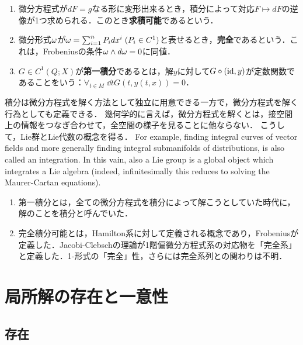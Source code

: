 \documentclass[uplatex, dvipdfmx]{jsreport}
\begin{document}
\begin{definition}\mbox{}
    \begin{enumerate}
        \item 微分方程式が$dF=g$なる形に変形出来るとき，積分によって対応$F\mapsto dF$の逆像が1つ求められる．このとき\textbf{求積可能}であるという．
        \item 微分形式$\omega$が$\omega=\sum_{i=1}^nP_idx^i\;(P_i\in C^1)$と表せるとき，\textbf{完全}であるという．これは，Frobeniusの条件$\omega\wedge d\omega=0$に同値．
        \item $G\in C^1(Q;X)$が\textbf{第一積分}であるとは，解$y$に対して$G\circ(\mathrm{id},y)$が定数関数であることをいう：$\forall_{t\in M}\;\dd{}{t}G(t,y(t,x))=0$．
    \end{enumerate}
\end{definition}
\begin{remarks}
    積分は微分方程式を解く方法として独立に用意できる一方で，微分方程式を解く行為としても定義できる．
    幾何学的に言えば，微分方程式を解くとは，接空間上の情報をつなぎ合わせて，全空間の様子を見ることに他ならない．
    こうして，Lie群とLie代数の概念を得る．
    For example, finding integral curves of vector fields and more generally finding integral submanifolds of distributions, is also called an integration. In this vain, also a Lie group is a global object which integrates a Lie algebra (indeed, infinitesimally this reduces to solving the Maurer-Cartan equations). 
\end{remarks}
\begin{history}\mbox{}
    \begin{enumerate}
        \item 第一積分とは，全ての微分方程式を積分によって解こうとしていた時代に，解のことを積分と呼んでいた．
        \item 完全積分可能とは，Hamilton系に対して定義される概念であり，Frobeniusが定義した．Jacobi-Clebschの理論が1階偏微分方程式系の対応物を「完全系」と定義した\cite{Bourbaki}．1-形式の「完全」性，さらには完全系列との関わりは不明．
    \end{enumerate}
\end{history}

\section{局所解の存在と一意性}

\subsection{存在}
\end{document}
